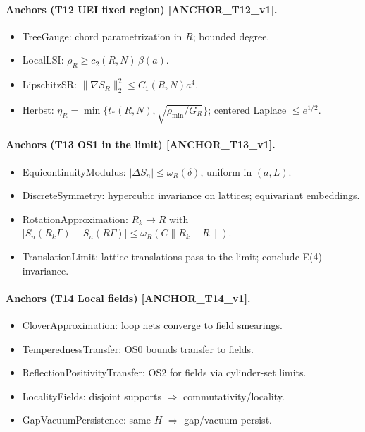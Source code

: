\documentclass[11pt]{amsart}
\theoremstyle{plain}
\theoremstyle{definition}
\theoremstyle{remark}
\begin{document}
\paragraph{Anchors (T12 UEI fixed region) [ANCHOR\_T12\_v1].}
\begin{itemize}
  \item TreeGauge: chord parametrization in $R$; bounded degree.
  \item LocalLSI: $\rho_R\ge c_2(R,N)\,\beta(a)$.
  \item LipschitzSR: $\|\nabla S_R\|_2^2\le C_1(R,N)a^4$.
  \item Herbst: $\eta_R=\min\{t_*(R,N),\sqrt{\rho_{\min}/G_R}\}$; centered Laplace $\le e^{1/2}$.
\end{itemize}

\paragraph{Anchors (T13 OS1 in the limit) [ANCHOR\_T13\_v1].}
\begin{itemize}
  \item EquicontinuityModulus: $|\Delta S_n|\le \omega_R(\delta)$, uniform in $(a,L)$.
  \item DiscreteSymmetry: hypercubic invariance on lattices; equivariant embeddings.
  \item RotationApproximation: $R_k\to R$ with $|S_n(R_k\Gamma)−S_n(R\Gamma)|\le \omega_R(C\|R_k−R\|)$.
  \item TranslationLimit: lattice translations pass to the limit; conclude E(4) invariance.
\end{itemize}

\paragraph{Anchors (T14 Local fields) [ANCHOR\_T14\_v1].}
\begin{itemize}
  \item CloverApproximation: loop nets converge to field smearings.
  \item TemperednessTransfer: OS0 bounds transfer to fields.
  \item ReflectionPositivityTransfer: OS2 for fields via cylinder-set limits.
  \item LocalityFields: disjoint supports $\Rightarrow$ commutativity/locality.
  \item GapVacuumPersistence: same $H$ $\Rightarrow$ gap/vacuum persist.
\end{itemize}
\end{document}
